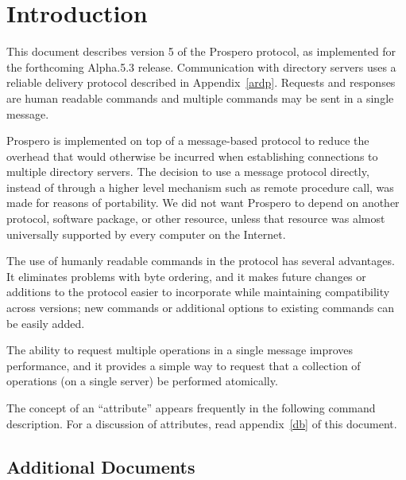 \tableofcontents

\chapter{Introduction}

This document describes version 5 of the Prospero protocol, as
implemented for the forthcoming Alpha.5.3 release.  Communication with
directory servers uses a reliable delivery protocol described in
Appendix~\ref{ardp}.  Requests and responses are human readable
commands and multiple commands may be sent in a single message.

Prospero is implemented on top of a message-based protocol to reduce the
overhead that would otherwise be incurred when establishing
connections to multiple directory servers.  The decision to use a
message protocol directly, instead of through a higher level
mechanism such as remote procedure call, was made for reasons of
portability.  We did not want Prospero to depend on another protocol,
software package, or other resource, unless that resource was almost
universally supported by every computer on the Internet.

The use of humanly readable commands in the protocol has several
advantages. It eliminates problems with byte ordering, and it makes
future changes or additions to the protocol easier to incorporate
while maintaining compatibility across versions; new commands or
additional options to existing commands can be easily added.

The ability to request multiple operations in a single message
improves performance, and it provides a simple way to request that a
collection of operations (on a single server) be performed atomically.

The concept of an ``attribute'' appears frequently in the following
command description.  For a discussion of attributes, read
appendix~\ref{db} of this document.

\section{Additional Documents}

